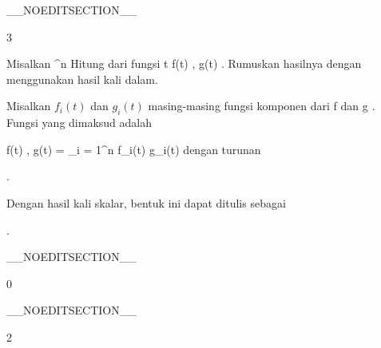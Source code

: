 __NOEDITSECTION__

{3}

{

Misalkan
 {\R} { \R^n
} {}
Hitung
dari fungsi
\maabbeledisp {} {\R} {\R
} { t } { \left\langle f(t) , g(t)  \right\rangle
} {.}
Rumuskan hasilnya dengan menggunakan hasil kali dalam.

}
{

Misalkan $f_i(t)$ dan $g_i(t)$ masing-masing fungsi komponen dari
\mathkor {} {f} {dan} {g} {.}
Fungsi yang dimaksud adalah

\mavergleichskettedisp
{\vergleichskette
{  \left\langle f(t) , g(t)  \right\rangle
}
{ =} { \sum_{i = 1}^n  f_i(t) g_i(t)
}
{ } {
}
{ } {
}
{ } {
}
}
{}{}{}
dengan turunan
 {} {}

 { . }

Dengan hasil kali skalar, bentuk ini dapat ditulis sebagai

 {  }

.

 }

__NOEDITSECTION__

{0}

{

}
{  }

__NOEDITSECTION__

{2}

